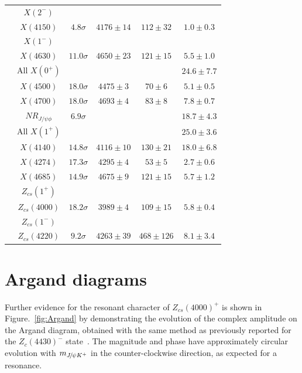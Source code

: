 \begin{table}[tbph]
\begin{center}
\begin{tabular}{cccccc}
\hline 
\hline
&$X(2^-)$ & & & &   \\
  &$X(4150)$            & $4.8\sigma$ & $4176\pm 14$ & $112\pm32$   & $1.0\pm0.3$ \\
\hline
&$X(1^-)$ & & & &   \\
  &$X(4630)$            & $11.0\sigma$ & $4650\pm 23$ & $121\pm15$  & $5.5\pm1.0$ \\
\hline

 &All $X(0^+)$ & & & & $24.6\pm7.7$  \\
 &$X(4500)$           & $18.0\sigma$ & $4475\pm 3$ & $70\pm6$ &  $5.1\pm0.5$ \\
 &$X(4700)$           & $18.0\sigma$ & $4693\pm 4$ & $83\pm8$ &  $7.8\pm0.7$ \\
 &$NR_{J/\psi \phi}$  & $6.9 \sigma $& & &$18.7\pm4.3$ \\
\hline
 &All $X(1^+)$ & & & & $25.0\pm3.6$ \\
 &$X(4140)$           & $14.8\sigma$ & $4116\pm 10$ & $130\pm21$ & $18.0\pm6.8$ \\
 &$X(4274)$           & $17.3\sigma$ & $4295\pm 4$  & $53\pm5$   & $2.7\pm0.6$ \\
 &$X(4685)$           & $14.9\sigma$ & $4675\pm 9$  & $121\pm15$ & $5.7\pm1.2$ \\
\hline\hline
&$Z_{cs}(1^+)$ \\
  &$Z_{cs}(4000)$          & $18.2\sigma$ & $3989\pm 4$  & $109\pm15$  & $5.8\pm0.4$ \\
  \hline
&$Z_{cs}(1^-)$ \\
  &$Z_{cs}(4220)$          & $9.2\sigma$ & $4263\pm39$ & $468\pm126$ & $8.1\pm3.4$ \\
\hline
\end{tabular}
\end{center}
\end{table}




\section{Argand diagrams}

Further evidence for the resonant character of $Z_{cs}(4000)^+$ is shown in Figure.~\ref{fig:Argand} by demonstrating the evolution of the complex amplitude on the Argand diagram, 
obtained with the same
method as previously reported for the $Z_c(4430)^-$ state~\supercite{LHCb-PAPER-2014-014}.
The magnitude and phase have approximately circular evolution with $m_{{{J\mskip -3mu/\mskip -2mu\psi}}{{K}^+}}$ in the counter-clockwise direction,
as expected for a resonance.

